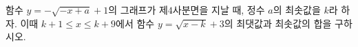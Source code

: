 함수 $y=-\sqrt{-x+a}+1$의 그래프가 제$4$사분면을 지날 때, 정수 $a$의 최솟값을 $k$라 하자. 이때 $k+1\le x\le k+9$에서 함수 $y=\sqrt{x-k}+3$의 최댓값과 최솟값의 합을 구하시오.
